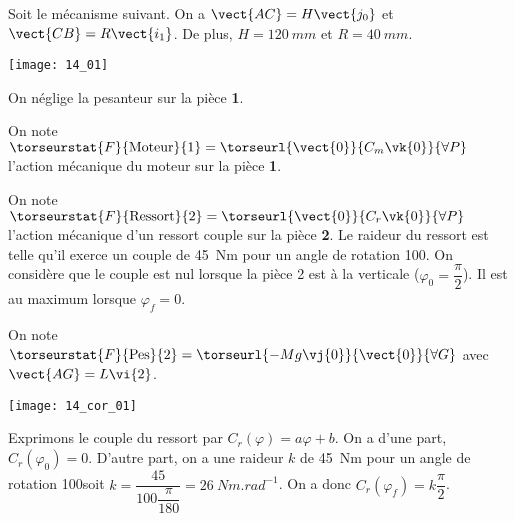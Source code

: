 \normalfalse \difficiletrue \tdifficilefalse
\correctiontrue


\setcounter{question}{0}%
\ifcorrection
\else
{}
\fi

\ifprof
\else
Soit le mécanisme suivant. On a $\vect{AC}=H\vect{j_0}$ et $\vect{CB}=R\vect{i_1}$. De plus, 
$H=\SI{120}{mm}$ et $R=\SI{40}{mm}$. 

\begin{marginfigure}
\texttt{[image: 14\_01]}
\end{marginfigure}
\fi

On néglige la pesanteur sur la pièce \textbf{1}. 

On note $\torseurstat{F}{\text{Moteur}}{1} = \torseurl{\vect{0}}{C_m\vk{0}}{\forall P}$ l'action mécanique du moteur sur la pièce \textbf{1}.

On note $\torseurstat{F}{\text{Ressort}}{2} = \torseurl{\vect{0}}{C_r\vk{0}}{\forall P}$ l'action mécanique d'un ressort couple sur la pièce \textbf{2}. Le raideur du ressort est telle qu'il exerce un couple de \SI{45}{Nm} pour un angle de rotation 100\degres. On considère que le couple est nul lorsque la pièce 2 est à la verticale ($\varphi_0=\dfrac{\pi}{2}$). Il est au maximum lorsque $\varphi_f=0$.

On note $\torseurstat{F}{\text{Pes}}{2} = \torseurl{-Mg\vj{0}}{\vect{0}}{\forall G}$ avec $\vect{AG}=L\vi{2}$. 

\ifprof
\begin{marginfigure}
\texttt{[image: 14\_cor\_01]}
\end{marginfigure}
\else
\fi

\ifprof
Exprimons le couple du ressort par $C_r(\varphi)=a\varphi + b$. On a d'une part, $C_r(\varphi_0)=0$. D'autre part, on a une raideur $k$ de \SI{45}{Nm} pour un angle de rotation 100\degres soit $k=\dfrac{45}{100 \dfrac{\pi}{180}} = \SI{26}{Nm.rad^{-1}}$. On a donc  $C_r(\varphi_f)=k \dfrac{\pi}{2}$.

